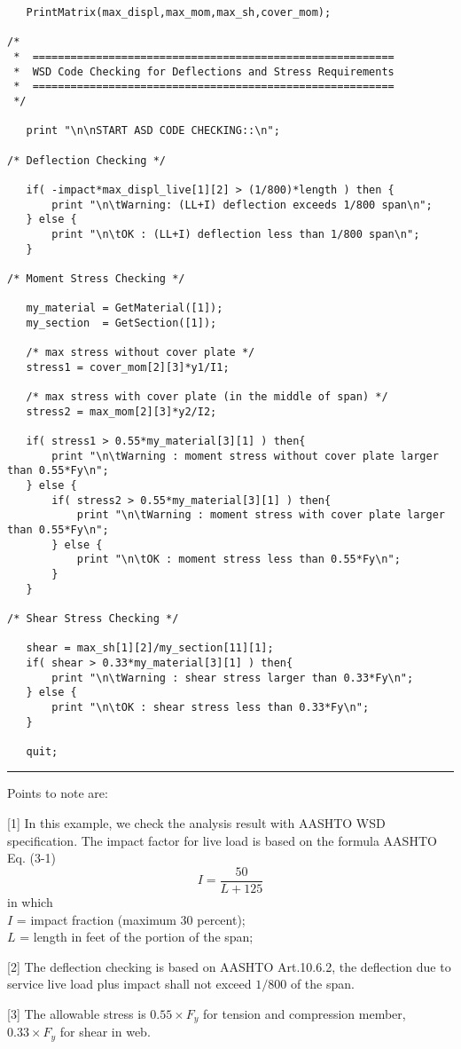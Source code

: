 \begin{footnotesize}
\begin{verbatim}
   PrintMatrix(max_displ,max_mom,max_sh,cover_mom);

/* 
 *  =========================================================
 *  WSD Code Checking for Deflections and Stress Requirements  
 *  =========================================================
 */ 

   print "\n\nSTART ASD CODE CHECKING::\n";

/* Deflection Checking */

   if( -impact*max_displ_live[1][2] > (1/800)*length ) then {
       print "\n\tWarning: (LL+I) deflection exceeds 1/800 span\n";
   } else {
       print "\n\tOK : (LL+I) deflection less than 1/800 span\n";
   }

/* Moment Stress Checking */

   my_material = GetMaterial([1]);
   my_section  = GetSection([1]);

   /* max stress without cover plate */
   stress1 = cover_mom[2][3]*y1/I1;

   /* max stress with cover plate (in the middle of span) */
   stress2 = max_mom[2][3]*y2/I2;

   if( stress1 > 0.55*my_material[3][1] ) then{
       print "\n\tWarning : moment stress without cover plate larger than 0.55*Fy\n";
   } else {
       if( stress2 > 0.55*my_material[3][1] ) then{
           print "\n\tWarning : moment stress with cover plate larger than 0.55*Fy\n";
       } else {
           print "\n\tOK : moment stress less than 0.55*Fy\n";
       }
   }

/* Shear Stress Checking */

   shear = max_sh[1][2]/my_section[11][1];
   if( shear > 0.33*my_material[3][1] ) then{
       print "\n\tWarning : shear stress larger than 0.33*Fy\n";
   } else {
       print "\n\tOK : shear stress less than 0.33*Fy\n";
   }

   quit;
\end{verbatim}
\rule{6.25 in}{0.035 in}
\end{footnotesize}

\vspace{0.15 in}\noindent
Points to note are:

\vspace{0.10 in}
\begin{description}
\item{[1]}
In this example, we check the analysis result with AASHTO WSD specification.
The impact factor for live load is based on the formula AASHTO Eq. (3-1)
\begin{displaymath}
I = \frac{50}{L+125} 
\end{displaymath}
in which\\
$I$ = impact fraction (maximum 30 percent);\\
$L$ = length in feet of the portion of the span;
\item{[2]}
The deflection checking is based on AASHTO Art.10.6.2, the deflection due to
service live load plus impact shall not exceed $1/800$ of the span.
\item{[3]}
The allowable stress is $0.55 \times F_{y}$ for tension and
compression member, $0.33 \times F_{y}$ for shear in web.
\end{description}

